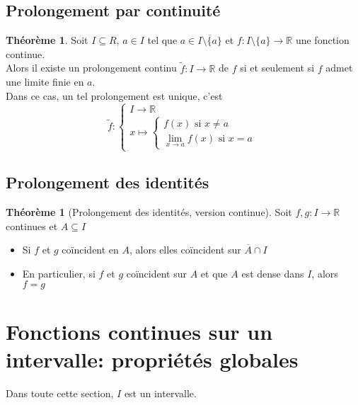\documentclass[10pt,a4paper]{article}
\theoremstyle{definition}
\newtheorem{theorem}[proposition]{Théorème}
\begin{document}
\subsection{Prolongement par continuité}
\begin{theorem}
Soit $I \subseteq R$, $a \in I$ tel que $a \in \overline{I \setminus \{ a \}}$ et $f: I \setminus \{ a \} \to \mathbb{R}$ une fonction continue. \\
Alors il existe un prolongement continu $\tilde{f}:I \to \mathbb{R}$ de $f$ si et seulement si $f$ admet une limite finie en $a$. \\
Dans ce cas, un tel prolongement est unique, c'est
\[\tilde{f}:\begin{cases}
I \to \mathbb{R} \\ x \mapsto \begin{cases}
f(x) \text{ si } x \neq a \\ \lim\limits_{x \to a} f(x) \text{ si } x = a
\end{cases}
\end{cases}\]
\end{theorem}

\subsection{Prolongement des identités}
\begin{theorem}[Prolongement des identités, version continue]
Soit $f, g: I \to \mathbb{R}$ continues et $A \subseteq I$
\begin{itemize}
\item Si $f$ et $g$ coïncident en $A$, alors elles coïncident sur $\overline{A} \cap I$
\item En particulier, si $f$ et $g$ coïncident sur $A$ et que $A$ est dense dans $I$, alors $f = g$
\end{itemize}
\end{theorem}

\section{Fonctions continues sur un intervalle: propriétés globales}
Dans toute cette section, $I$ est un intervalle.
\end{document}
